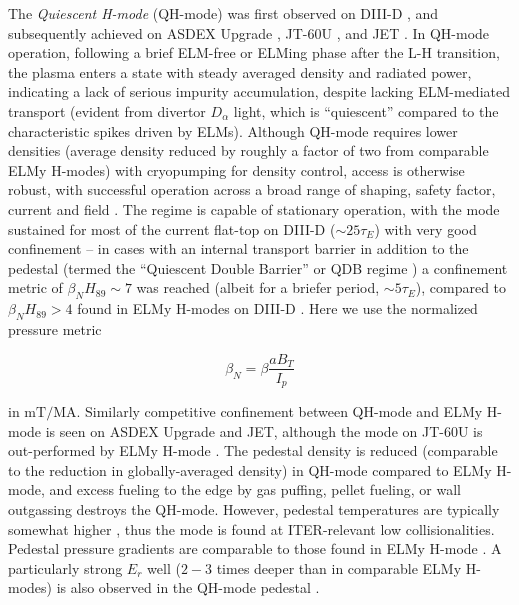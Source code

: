 The \emph{Quiescent H-mode} (QH-mode) was first observed on DIII-D \cite{Burrell2002,Groebner2001}, and subsequently achieved on ASDEX Upgrade \cite{Suttrop2003a}, JT-60U \cite{Sakamoto2004}, and JET \cite{Suttrop2005}.  In QH-mode operation, following a brief ELM-free or ELMing phase after the L-H transition, the plasma enters a state with steady averaged density and radiated power, indicating a lack of serious impurity accumulation, despite lacking ELM-mediated transport (evident from divertor $D_\alpha$ light, which is ``quiescent'' compared to the characteristic spikes driven by ELMs).  Although QH-mode requires lower densities (average density reduced by roughly a factor of two from comparable ELMy H-modes) with cryopumping for density control, access is otherwise robust, with successful operation across a broad range of shaping, safety factor, current and field \cite{Burrell2002}.  The regime is capable of stationary operation, with the mode sustained for most of the current flat-top on DIII-D ($\sim 25 \tau_E$) with very good confinement -- in cases with an internal transport barrier in addition to the pedestal (termed the ``Quiescent Double Barrier'' or QDB regime \cite{Burrell2001,Doyle2001,Greenfield2002}) a confinement metric of $\beta_N H_{89} \sim 7$ was reached (albeit for a briefer period, $\sim 5 \tau_E$), compared to $\beta_N H_{89} > 4$ found in ELMy H-modes on DIII-D \cite{Doyle2001}.  Here we use the normalized pressure metric \cite{Troyon1984}

\begin{equation}\label{eq:betan}
 \beta_N = \beta \frac{aB_T}{I_p}
\end{equation}

\noindent in $\si{\meter\tesla\per\mega\ampere}$.  Similarly competitive confinement between QH-mode and ELMy H-mode is seen on ASDEX Upgrade and JET, although the mode on JT-60U is out-performed by ELMy H-mode \cite{Oyama2006}.  The pedestal density is reduced (comparable to the reduction in globally-averaged density) in QH-mode compared to ELMy H-mode, and excess fueling to the edge by gas puffing, pellet fueling, or wall outgassing destroys the QH-mode.  However, pedestal temperatures are typically somewhat higher \cite{Doyle2001}, thus the mode is found at ITER-relevant low collisionalities.  Pedestal pressure gradients are comparable to those found in ELMy H-mode \cite{Burrell2002}.  A particularly strong $E_r$ well ($2-3$ times deeper than in comparable ELMy H-modes) is also observed in the QH-mode pedestal \cite{Greenfield2002}.

